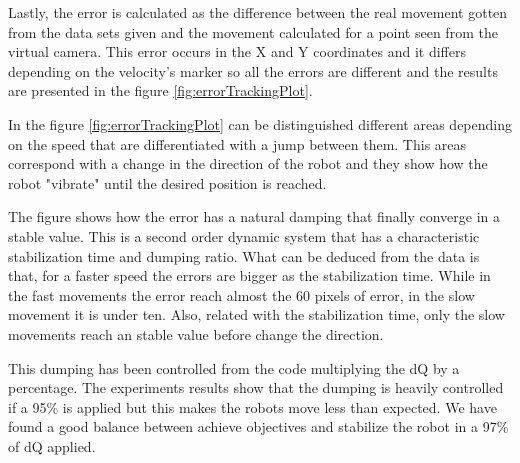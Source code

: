 Lastly, the error is calculated as the difference between the real movement gotten from the data sets given and the movement calculated for a point seen from the virtual camera.
This error occurs in the X and Y coordinates and it differs depending on the velocity's marker so all the errors are different and the results are presented in the figure \ref{fig:errorTrackingPlot}.

	\ifx \plots \yes
		\errorTrackingPlot
	\fi
	
In the figure \ref{fig:errorTrackingPlot} can be distinguished different areas depending on the speed that are differentiated with a jump between them. 
This areas correspond with a change in the direction of the robot and they show how the robot "vibrate" until the desired position is reached.

The figure shows how the error has a natural damping that finally converge in a stable value. This is a second order dynamic system that has a characteristic stabilization time and dumping ratio. What can be deduced from the data is that, for a faster speed the errors are bigger as the stabilization time. While in the fast movements the error reach almost the 60 pixels of error, in the slow movement it is under ten. Also, related with the stabilization time, only the slow movements reach an stable value before change the direction.

This dumping has been controlled from the code multiplying the dQ by a percentage. The experiments results show that the dumping is heavily controlled if a 95\% is applied but this makes the robots move less than expected. We have found a good balance between achieve objectives and stabilize the robot in a 97\% of dQ applied.

